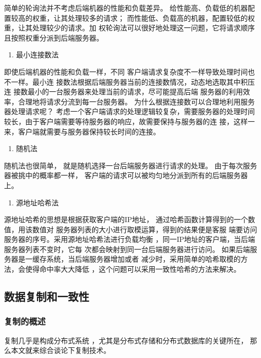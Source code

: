 	简单的轮询法并不考虑后端机器的性能和负载差异。
	给性能高、负载低的机器配置较高的权重，让其处理较多的请求；
	而性能低、负载高的机器，配置较低的权重，让其处理较少的请求。加
	权轮询法可以很好地处理这一问题，它将请求顺序且按照权重分派到后端服务器。 

\begin{enumerate}[resume]
	\item 最小连接数法
\end{enumerate}

	即使后端机器的性能和负载一样，不同
	客户端请求复杂度不一样导致处理时间也不一样。最小连
	接数法根据后端服务器当前的连接数情况，动态地选取其中积压连
	接数最小的一台服务器来处理当前的请求，尽可能提高后端
	服务器的利用效率，合理地将请求分流到每一台服务器。 
	为什么根据连接数可以合理地利用服务器处理请求呢？ 
	考虑一个客户端请求的处理逻辑较复杂，需要服务器的处理时间
	较长，由于客户端需要等待服务器的响应，故需要保持与服务器的连
	接，这样一来，客户端就需要与服务器保持较长时间的连接。 

\begin{enumerate}[resume]
	\item 随机法
\end{enumerate}

	随机法也很简单，
	就是随机选择一台后端服务器进行请求的处理。
	由于每次服务器被挑中的概率都一样，
	客户端的请求可以被均匀地分派到所有的后端服务器上。

\begin{enumerate}[resume]
	\item 源地址哈希法
\end{enumerate}

	源地址哈希的思想是根据获取客户端的IP地址，
	通过哈希函数计算得到的一个数值，用该数值对
	服务器列表的大小进行取模运算，得到的结果便是客服
	端要访问服务器的序号。采用源地址哈希法进行负载均衡
	，同一IP地址的客户端，当后端服务器列表不变时，它每
	次都会映射到同一台后端服务器进行访问。 
	如果后端服务器是一缓存系统，当后端服务器增加或者
	减少时，采用简单的哈希取模的方法，会使得命中率大大降低
	，这个问题可以采用一致性哈希的方法来解决。 
\subsection{数据复制和一致性}
\subsubsection{复制的概述}
复制几乎是构成分布式系统
，尤其是分布式存储和分布式数据库的关键所在，
那么本文就来综合谈论下复制技术。

